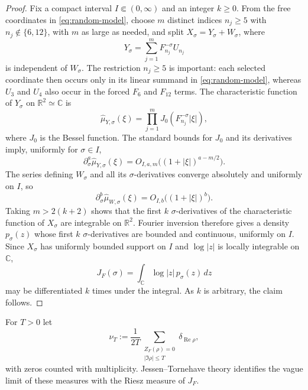 \documentclass[11pt]{article}
\theoremstyle{remark}
\newcommand{\ZF}{Z_F}
\newcommand{\Ree}{\operatorname{Re}}
\newcommand{\JF}{J_F}
\begin{document}
\begin{proof}
Fix a compact interval $I\Subset(0,\infty)$ and an integer $k\ge0$.  From the free coordinates in \eqref{eq:random-model}, choose $m$ distinct indices $n_j\ge5$ with $n_j\notin\{6,12\}$, with $m$ as large as needed, and split
$X_\sigma=Y_\sigma+W_\sigma$, where
\[
Y_\sigma=\sum_{j=1}^{m}F_{n_j}^{-\sigma}U_{n_j}
\]
is independent of $W_\sigma$.  The restriction $n_j\ge5$ is important: each selected coordinate then occurs only in its linear summand in \eqref{eq:random-model}, whereas $U_3$ and $U_4$ also occur in the forced $F_6$ and $F_{12}$ terms.  The characteristic function of $Y_\sigma$ on $\mathbb R^2\simeq\mathbb C$ is
\[
\widehat\mu_{Y,\sigma}(\xi)
=\prod_{j=1}^{m}J_0(F_{n_j}^{-\sigma}|\xi|),
\]
where $J_0$ is the Bessel function.  The standard bounds for $J_0$ and its derivatives imply, uniformly for $\sigma\in I$,
\[
\partial_\sigma^a\widehat\mu_{Y,\sigma}(\xi)
=O_{I,a,m}\bigl((1+|\xi|)^{a-m/2}\bigr).
\]
The series defining $W_\sigma$ and all its $\sigma$-derivatives converge absolutely and uniformly on $I$, so
\[
\partial_\sigma^b\widehat\mu_{W,\sigma}(\xi)
=O_{I,b}\bigl((1+|\xi|)^b\bigr).
\]
Taking $m>2(k+2)$ shows that the first $k$ $\sigma$-derivatives of the characteristic function of $X_\sigma$ are integrable on $\mathbb R^2$.  Fourier inversion therefore gives a density $p_\sigma(z)$ whose first $k$ $\sigma$-derivatives are bounded and continuous, uniformly on $I$.  Since $X_\sigma$ has uniformly bounded support on $I$ and $\log|z|$ is locally integrable on $\mathbb C$,
\[
\JF(\sigma)=\int_{\mathbb C}\log|z|\,p_\sigma(z)\,dz
\]
may be differentiated $k$ times under the integral.  As $k$ is arbitrary, the claim follows.
\end{proof}

For $T>0$ let
\[
\nu_T:=\frac1{2T}\sum_{\substack{\ZF(\rho)=0\\ |\Im\rho|\le T}}
\delta_{\Ree\rho},
\]
with zeros counted with multiplicity.  Jessen--Tornehave theory identifies the vague limit of these measures with the Riesz measure of $\JF$.
\end{document}
